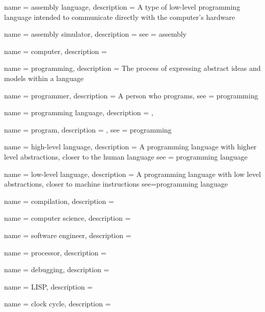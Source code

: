 \makeglossaries


 {
  name = {assembly language},
  description = {A type of low-level programming language intended to communicate directly with the computer's hardware}
}

 {
  name = {assembly simulator},
  description = {}
  see = {assembly}
}

 {
  name = {computer},
  description = {}
}

 {
  name = {programming},
  description = {The process of expressing abstract ideas and models within a language}
}

 {
  name = {programmer},
  description = {A person who programs},
  see = {programming}
}

 {
  name = {programming language},
  description = {},
}

 {
  name = {program},
  description = {},
  see = {programming}
}

 {
  name = {high-level language},
  description = {A programming language with higher level abstractions, closer to the human language}
  see = {programming language}
}

 {
  name = {low-level language},
  description = {A programming language with low level abstractions, closer to machine instructions}
  see={programming language}
}

 {
  name = {compilation},
  description = {}
}

 {
  name = {computer science},
  description = {}
}

 {
  name = {software engineer},
  description = {}
}

 {
  name = {processor},
  description = {}
}

 {
  name = {debugging},
  description = {}
}

 {
  name = {LISP},
  description = {}
}

 {
  name = {clock cycle},
  description = {}
}

